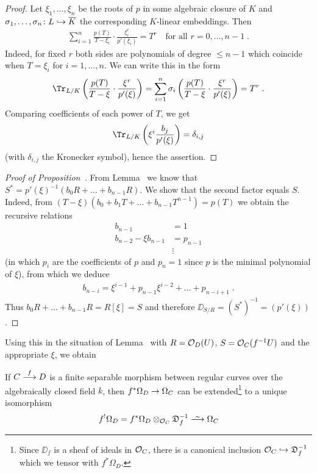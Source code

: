 \documentclass[a4paper,parskip=half,numbers=enddot, DIV=12]{scrreprt}
\renewcommand{\leq}{\leqslant}
\begin{document}
\begin{proof}
	Let $\xi_1,\ldots,\xi_n$ be the roots of $p$ in some algebraic closure of $K$ and $\sigma_1,\ldots,\sigma_n\colon L\monomorphism\ov{K}$ the corresponding $K$-linear embeddings. Then
	\begin{align*}
		\sum_{i=1}^{n}\frac{p(T)}{T-\xi_i}\cdot\frac{\xi_i^r}{p'(\xi_i)}=T^r\quad\text{for all }r=0,\ldots,n-1\;.
	\end{align*}
	Indeed, for fixed $r$ both sides are polynomials of degree $\leq n-1$ which coincide when $T=\xi_i$ for $i=1,\ldots,n$. We can write this in the form
	\begin{align*}
		\Tr_{L/K}\left(\frac{p(T)}{T-\xi}\cdot\frac{\xi^r}{p'(\xi)}\right)=\sum_{i=1}^n\sigma_i\left(\frac{p(T)}{T-\xi}\cdot\frac{\xi^r}{p'(\xi)}\right)=T^r\;.
	\end{align*}
	Comparing coefficients of each power of $T$, we get
	\begin{align*}
		\Tr_{L/K}\left(\xi^i\frac{b_j}{p'(\xi)}\right)=\delta_{i,j}
	\end{align*}
	(with $\delta_{i,j}$ the Kronecker symbol), hence the assertion.
\end{proof}
\begin{proof}[Proof of Proposition~]
	From Lemma~ we know that $S^*=p'(\xi)^{-1}(b_0R+\ldots+b_{n-1}R)$. We show that the second factor equals $S$. Indeed, from $(T-\xi)(b_0+b_1T+\ldots+b_{n-1}T^{n-1})=p(T)$ we obtain the recursive relations
	\begin{align*}
		b_{n-1}&=1\\
		 b_{n-2}-\xi b_{n-1}&=p_{n-1}\\
		 &\vdots
	\end{align*}
	(in which $p_i$ are the coefficients of $p$ and $p_n=1$ since $p$ is the minimal polynomial of $\xi$), from which we deduce
	\begin{align*}
		b_{n-i}=\xi^{i-1}+p_{n-1}\xi^{i-2}+\ldots+p_{n-i+1}\;.
	\end{align*}
	Thus $b_0R+\ldots+b_{n-1}R=R[\xi]=S$ and therefore $\DD_{S/R}=(S^*)^{-1}=(p'(\xi))$.
\end{proof}
Using this in the situation of Lemma~ with $R=\mathcal{O}_D(U)$, $S=\mathcal{O}_C(f^{-1}U)$ and the appropriate $\xi$, we obtain
\begin{prop}
	If $C\morphism[f]D$ is a finite separable morphism between regular curves over the algebraically closed field $k$, then $f^*\Omega_D\morphism\Omega_C$ can be extended\footnote{Since $\DD_f$ is a sheaf of ideals in $\mathcal{O}_C$, there is a canonical inclusion $\Oo_C\monomorphism\DD_f^{-1}$ which we tensor with $f^*\Omega_D$.} to a unique isomorphism
	\begin{align*}
		f^!\Omega_D=f^*\Omega_D\otimes_{\Oo_C}\DD_f^{-1}\isomorphism\Omega_C
	\end{align*}
\end{prop}
\end{document}
